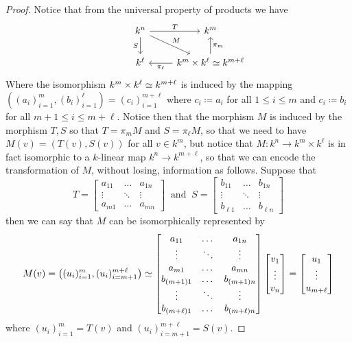 \begin{proof}
    Notice that from the universal property of products we have
    \[
        \begin{tikzcd}
            &k^n \ar["T", r] \ar["M", dr] \ar[swap, "S", d] &k^m \\
            &k^\ell &k^m \times k^\ell \iso k^{m+\ell} \ar["\pi_\ell", l]
            \ar[swap, "\pi_m", u]
        \end{tikzcd}
    \]
    Where the isomorphism \(k^m \times k^\ell \simeq k^{m+\ell}\) is induced by the
    mapping  \(((a_i)_{i=1}^m, (b_i)_{i=1}^\ell) = (c_i)_{i=1}^{m+\ell}\) where
    \(c_i \coloneq a_i\) for all \(1 \leq i \leq m\) and \(c_i \coloneq b_i\) for all  \(m+1
    \leq i \leq m+\ell\). Notice then that the morphism \(M\) is induced by the
    morphism \(T, S\) so that \(T = \pi_m  M\) and \(S = \pi_\ell  M\),
    so that we need to have \(M(v) = (T(v), S(v))\) for all \(v \in k^m\), but
    notice that \(M : k^n \to k^m\times k^\ell\) is in fact isomorphic to a
    \(k\)-linear map \(k^n \to k^{m+\ell}\), so that we can encode the
    transformation of \(M\), without losing, information as follows. Suppose that
    \[
        T =
        \begin{bmatrix}
            a_{11} & \dots  & a_{1n} \\
            \vdots & \ddots & \vdots \\
            a_{m1} & \dots  & a_{mn}
        \end{bmatrix}
        \ \text{ and }\
        S =
        \begin{bmatrix}
            b_{11}     & \dots  & b_{1n}     \\
            \vdots     & \ddots & \vdots     \\
            b_{\ell 1} & \dots  & b_{\ell n}
        \end{bmatrix}
    \]
    then we can say that \(M\) can be isomorphically represented by
    \[
        M(v) = \left((u_i)_{i=1}^m, (u_i)_{i=m+1}^{m+\ell} \right) \simeq
        \begin{bmatrix}
            a_{11}         & \dots  & a_{1n}         \\
            \vdots         & \ddots & \vdots         \\
            a_{m1}         & \dots  & a_{mn}         \\
            b_{(m+1) 1}    & \dots  & b_{(m+1) n}    \\
            \vdots         & \ddots & \vdots         \\
            b_{(m+\ell) 1} & \dots  & b_{(m+\ell) n}
        \end{bmatrix}
        \begin{bmatrix}
            v_1 \\ \vdots \\ v_n
        \end{bmatrix}
        =
        \begin{bmatrix} u_1 \\ \vdots \\ u_{m+\ell} \end{bmatrix}
    \]
    where \((u_i)_{i=1}^m = T(v) \) and \((u_i)_{i=m+1}^{m+\ell} = S(v)\).
\end{proof}

